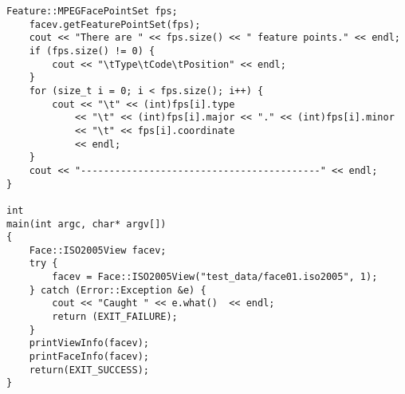 \begin{lstlisting}[caption={Using the Face::ISO2005View Class}, label=lst:isofaceuse]
	Feature::MPEGFacePointSet fps;
	facev.getFeaturePointSet(fps);
	cout << "There are " << fps.size() << " feature points." << endl;
	if (fps.size() != 0) {
		cout << "\tType\tCode\tPosition" << endl;
	}
	for (size_t i = 0; i < fps.size(); i++) {
		cout << "\t" << (int)fps[i].type
		    << "\t" << (int)fps[i].major << "." << (int)fps[i].minor
		    << "\t" << fps[i].coordinate
		    << endl;
	}
	cout << "------------------------------------------" << endl;
}

int
main(int argc, char* argv[])
{
	Face::ISO2005View facev;
	try {
		facev = Face::ISO2005View("test_data/face01.iso2005", 1);
	} catch (Error::Exception &e) {
		cout << "Caught " << e.what()  << endl;
		return (EXIT_FAILURE);
	}
	printViewInfo(facev);
	printFaceInfo(facev);
	return(EXIT_SUCCESS);
}
\end{lstlisting}
